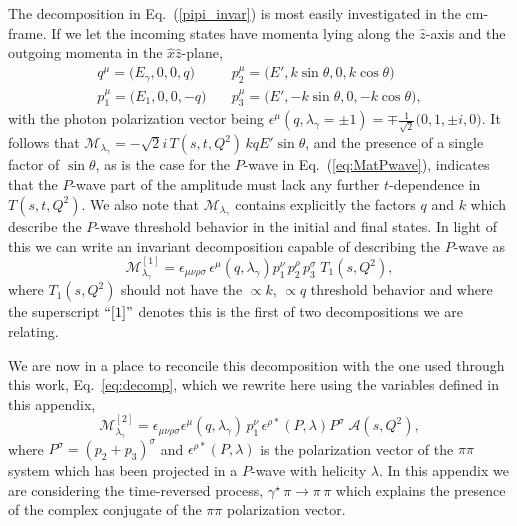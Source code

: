 {The decomposition in Eq.~(\ref{pipi_invar}) is most easily investigated in the cm-frame. If we let the incoming states have momenta lying along the $\hat{z}$-axis and the outgoing momenta in the $\hat{x}\hat{z}$-plane,
\begin{align*}
q^\mu = \big( E_\gamma, 0, 0, q \big) 	\quad& p_2^\mu = \big( E', k\sin \theta , 0, k \cos \theta \big) \\
p_1^\mu = \big( E_1, 0, 0, -q \big) 	\quad& p_3^\mu = \big( E', -k\sin \theta , 0, -k \cos \theta \big), 
\end{align*}
with the photon polarization vector being ${\epsilon^\mu(q, \lambda_\gamma = \pm 1) = \mp \tfrac{1}{\sqrt{2}} \big( 0, 1, \pm i , 0 \big)}$. It follows that $\mathcal{M}_{\lambda_\gamma} =	-\sqrt{2} i \,  T(s,t,Q^2)\, k q E' \sin \theta $, and the presence of a single factor of $\sin \theta$, as is the case for the $P$-wave in Eq.~(\ref{eq:MatPwave}), indicates that the $P$-wave part of the amplitude must lack any further $t$-dependence in $T(s,t,Q^2)$. We also note that $\mathcal{M}_{\lambda_\gamma}$ contains explicitly the factors $q$ and $k$ which describe the $P$-wave threshold behavior in the initial and final states. In light of this we can write an invariant decomposition capable of describing the $P$-wave as
%
\begin{equation}
\mathcal{M}_{\lambda_\gamma}^{\mathrm{[1]}} = \epsilon_{\mu \nu \rho \sigma}\,  \epsilon^\mu(q,\lambda_\gamma) p_1^\nu \, p_2^\rho \, p_3^\sigma \; T_1(s,Q^2) \label{pipi_P_invar},
\end{equation}
where $T_1(s,Q^2)$ should not have the $\propto k$, $\propto q$ threshold behavior and where the superscript ${\rm ``[1]"}$ denotes this is the first of two decompositions we are relating. 



We are now in a place to reconcile this decomposition with the one used through this work, Eq.~\ref{eq:decomp}, which we rewrite here using the variables defined in this appendix,
\begin{equation}
\mathcal{M}_{\lambda_\gamma}^{[2]} =\epsilon_{\mu \nu \rho \sigma} \epsilon^\mu(q,\lambda_\gamma)\,  p_1^\nu\,  \epsilon^{\rho*}(P,\lambda) P^\sigma\; \mathcal A(s,Q^2) , \label{rho_pi_gamma}
\end{equation}
where $P^\sigma=(p_2+p_3)^\sigma$ and $\epsilon^{\rho*}(P,\lambda)$ is the polarization vector of the $\pi\pi$ system which has been projected in a \mbox{$P$-wave} with helicity $\lambda$. In this appendix we are considering the time-reversed process, $\gamma^\star \, \pi \to \pi\, \pi$ which explains the presence of the complex conjugate of the $\pi\pi$ polarization vector. 

}

